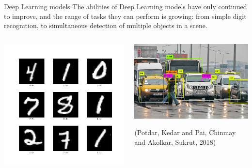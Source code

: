 \documentclass[smaller]{beamer}
\begin{document}
\begin{frame}[label={sec:orgf6978f4}]{Deep Learning models}
The abilities of Deep Learning models have only continued to improve, and the range
of tasks they can perform is growing: from simple digit recognition, to simultaneous
detection of multiple objects in a scene.

\begin{columns}
\begin{column}{0.3\columnwidth}
\begin{center}
\includegraphics[width=.9\linewidth]{images/mnist.png}
\end{center}
\end{column}

\begin{column}{0.7\columnwidth}
\begin{center}
\includegraphics[width=.9\linewidth]{images/Object-detection-in-a-dense-scene.jpg}
\end{center}
(Potdar, Kedar and Pai, Chinmay and Akolkar, Sukrut, 2018)
\end{column}
\end{columns}
\end{frame}
\end{document}

